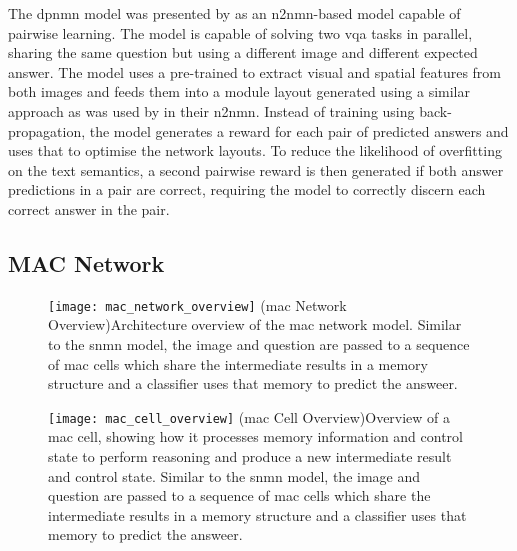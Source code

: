 The \gls{dpnmn} model was presented by \citeauthor{su_toward_2020} \cite{su_toward_2020} as an \gls{n2nmn}-based model capable of pairwise learning.
The model is capable of solving two \gls{vqa} tasks in parallel, sharing the same question but using a different image and different expected answer.
The model uses a pre-trained  to extract visual and spatial features from both images and feeds them into a module layout generated using a similar approach as was used by \citeauthor{hu_learning_2017} in their \gls{n2nmn}.
Instead of training using back-propagation, the model generates a reward for each pair of predicted answers and uses that to optimise the network layouts.
To reduce the likelihood of overfitting on the text semantics, a second pairwise reward is then generated if both answer predictions in a pair are correct, requiring the model to correctly discern each correct answer in the pair.

\subsection{MAC Network}
\label{subsec:mac_network}

\begin{figure}[htbp]
    \centering
    \texttt{[image: mac\_network\_overview]}
    \captionsource(\acrshort{mac} Network Overview){Architecture overview of the \acrshort{mac} network model. Similar to the \gls{snmn} model, the image and question are passed to a sequence of \acrshort{mac} cells which share the intermediate results in a memory structure and a classifier uses that memory to predict the answeer. \label{fig:mac_network_overview}}{\citeauthor{hudson_compositional_2018}\cite{hudson_compositional_2018}}
\end{figure}
\begin{figure}[htbp]
    \centering
    \texttt{[image: mac\_cell\_overview]}
    \captionsource(\acrshort{mac} Cell Overview){Overview of a \acrshort{mac} cell, showing how it processes memory information and control state to perform reasoning and produce a new intermediate result and control state. Similar to the \gls{snmn} model, the image and question are passed to a sequence of \acrshort{mac} cells which share the intermediate results in a memory structure and a classifier uses that memory to predict the answeer. \label{fig:mac_cell_overview}}{\citeauthor{hudson_compositional_2018}\cite{hudson_compositional_2018}}
\end{figure}

